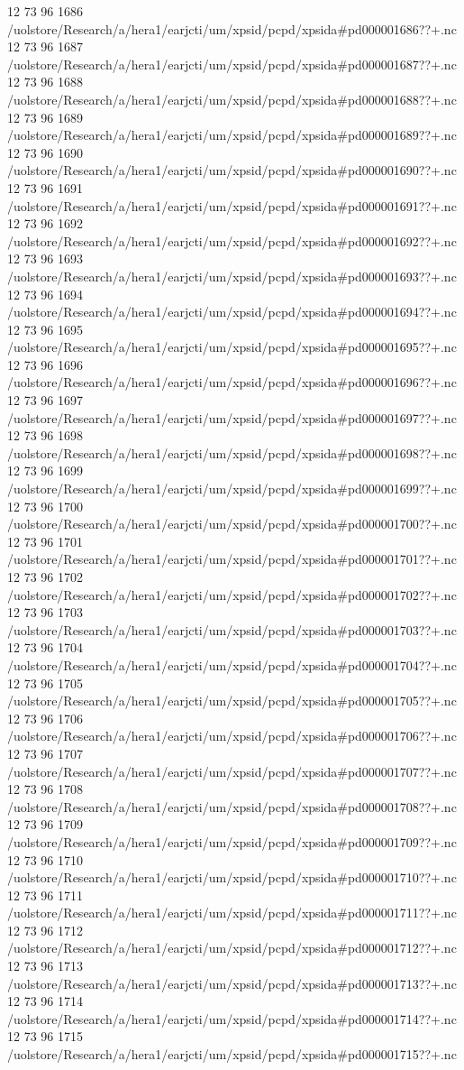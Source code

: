 12 73 96
1686
/uolstore/Research/a/hera1/earjcti/um/xpsid/pcpd/xpsida#pd000001686??+.nc
12 73 96
1687
/uolstore/Research/a/hera1/earjcti/um/xpsid/pcpd/xpsida#pd000001687??+.nc
12 73 96
1688
/uolstore/Research/a/hera1/earjcti/um/xpsid/pcpd/xpsida#pd000001688??+.nc
12 73 96
1689
/uolstore/Research/a/hera1/earjcti/um/xpsid/pcpd/xpsida#pd000001689??+.nc
12 73 96
1690
/uolstore/Research/a/hera1/earjcti/um/xpsid/pcpd/xpsida#pd000001690??+.nc
12 73 96
1691
/uolstore/Research/a/hera1/earjcti/um/xpsid/pcpd/xpsida#pd000001691??+.nc
12 73 96
1692
/uolstore/Research/a/hera1/earjcti/um/xpsid/pcpd/xpsida#pd000001692??+.nc
12 73 96
1693
/uolstore/Research/a/hera1/earjcti/um/xpsid/pcpd/xpsida#pd000001693??+.nc
12 73 96
1694
/uolstore/Research/a/hera1/earjcti/um/xpsid/pcpd/xpsida#pd000001694??+.nc
12 73 96
1695
/uolstore/Research/a/hera1/earjcti/um/xpsid/pcpd/xpsida#pd000001695??+.nc
12 73 96
1696
/uolstore/Research/a/hera1/earjcti/um/xpsid/pcpd/xpsida#pd000001696??+.nc
12 73 96
1697
/uolstore/Research/a/hera1/earjcti/um/xpsid/pcpd/xpsida#pd000001697??+.nc
12 73 96
1698
/uolstore/Research/a/hera1/earjcti/um/xpsid/pcpd/xpsida#pd000001698??+.nc
12 73 96
1699
/uolstore/Research/a/hera1/earjcti/um/xpsid/pcpd/xpsida#pd000001699??+.nc
12 73 96
1700
/uolstore/Research/a/hera1/earjcti/um/xpsid/pcpd/xpsida#pd000001700??+.nc
12 73 96
1701
/uolstore/Research/a/hera1/earjcti/um/xpsid/pcpd/xpsida#pd000001701??+.nc
12 73 96
1702
/uolstore/Research/a/hera1/earjcti/um/xpsid/pcpd/xpsida#pd000001702??+.nc
12 73 96
1703
/uolstore/Research/a/hera1/earjcti/um/xpsid/pcpd/xpsida#pd000001703??+.nc
12 73 96
1704
/uolstore/Research/a/hera1/earjcti/um/xpsid/pcpd/xpsida#pd000001704??+.nc
12 73 96
1705
/uolstore/Research/a/hera1/earjcti/um/xpsid/pcpd/xpsida#pd000001705??+.nc
12 73 96
1706
/uolstore/Research/a/hera1/earjcti/um/xpsid/pcpd/xpsida#pd000001706??+.nc
12 73 96
1707
/uolstore/Research/a/hera1/earjcti/um/xpsid/pcpd/xpsida#pd000001707??+.nc
12 73 96
1708
/uolstore/Research/a/hera1/earjcti/um/xpsid/pcpd/xpsida#pd000001708??+.nc
12 73 96
1709
/uolstore/Research/a/hera1/earjcti/um/xpsid/pcpd/xpsida#pd000001709??+.nc
12 73 96
1710
/uolstore/Research/a/hera1/earjcti/um/xpsid/pcpd/xpsida#pd000001710??+.nc
12 73 96
1711
/uolstore/Research/a/hera1/earjcti/um/xpsid/pcpd/xpsida#pd000001711??+.nc
12 73 96
1712
/uolstore/Research/a/hera1/earjcti/um/xpsid/pcpd/xpsida#pd000001712??+.nc
12 73 96
1713
/uolstore/Research/a/hera1/earjcti/um/xpsid/pcpd/xpsida#pd000001713??+.nc
12 73 96
1714
/uolstore/Research/a/hera1/earjcti/um/xpsid/pcpd/xpsida#pd000001714??+.nc
12 73 96
1715
/uolstore/Research/a/hera1/earjcti/um/xpsid/pcpd/xpsida#pd000001715??+.nc
